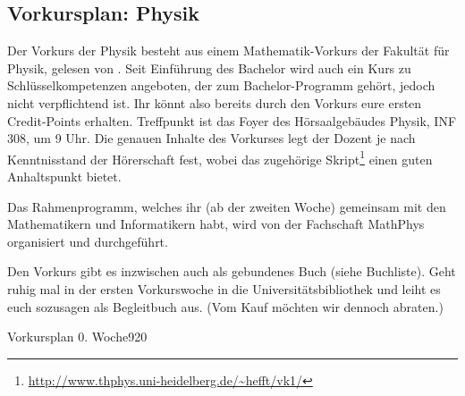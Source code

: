 \subsection*{\Large Vorkursplan: Physik}
\addtocounter{section}{1}
Der Vorkurs der Physik besteht aus einem Mathematik-Vorkurs der Fakultät für Physik, gelesen von \dozentvorkurs. Seit Einführung des Bachelor wird auch ein Kurs zu Schlüsselkompetenzen angeboten, der zum Bachelor-Programm gehört, jedoch nicht verpflichtend ist. Ihr könnt also bereits durch den Vorkurs eure ersten Credit-Points erhalten. Treffpunkt ist das Foyer des Hörsaalgebäudes Physik, \Gls{INF} 308, um 9 Uhr. Die genauen Inhalte des Vorkurses legt der Dozent je nach Kenntnisstand der Hörerschaft fest, wobei das zugehörige Skript\footnote{\url{http://www.thphys.uni-heidelberg.de/~hefft/vk1/}} einen guten Anhaltspunkt bietet.

Das Rahmenprogramm, welches ihr (ab der zweiten Woche) gemeinsam mit den Mathematikern und Informatikern habt, wird von der Fachschaft MathPhys organisiert und durchgeführt.%

Den Vorkurs gibt es inzwischen auch als gebundenes Buch (siehe Buchliste). Geht ruhig mal in der ersten Vorkurswoche in die Universitätsbibliothek und leiht es euch sozusagen als Begleitbuch aus. (Vom Kauf möchten wir dennoch abraten.)

\begin{stundenplan}{Vorkursplan 0. Woche}{9}{20}





\end{stundenplan}

